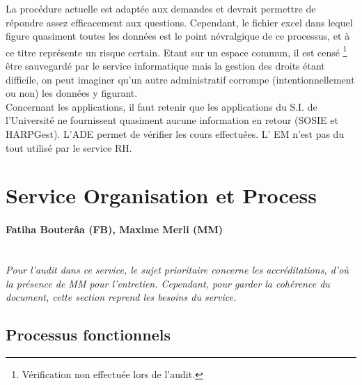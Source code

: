 \documentclass{book}
\begin{document}
La procédure actuelle est adaptée aux demandes et devrait permettre de 
répondre assez efficacement aux questions. Cependant, le fichier excel
dans lequel figure quasiment toutes les données est le point névralgique
de ce processus, et à ce titre représente un risque certain. Etant sur
un espace commun, il est censé%
\footnote{Vérification non effectuée lors de l'audit.}
être sauvegardé par le service informatique mais la gestion des droits
étant difficile, on peut imaginer qu'un autre administratif corrompe 
(intentionnellement ou non) les données y figurant.\\

Concernant les applications, il faut retenir que les applications
du S.I. de l'Université ne fournissent quasiment aucune information en
retour (SOSIE et HARPGest). L'ADE permet de vérifier les cours effectuées.
L' EM n'est pas du tout utilisé par le service RH.
 



\section{Service Organisation et Process}

\paragraph{Fatiha Bouterâa (FB), Maxime Merli (MM)} 
~\\

\textit{Pour l'audit dans ce service, le sujet prioritaire concerne les 
accréditations, d'où la présence de MM pour l'entretien. Cependant, pour 
garder la cohérence du document, cette section reprend les besoins du service.}

\subsection{Processus fonctionnels}
\label{sc:sop-process}
\end{document}
